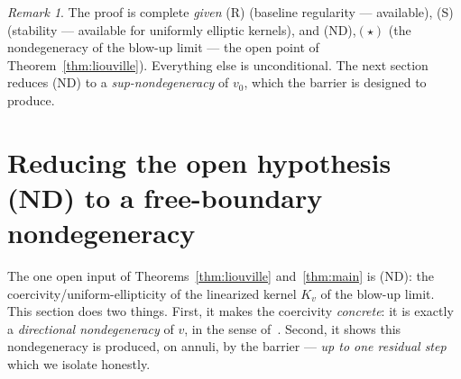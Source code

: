 \documentclass[11pt]{amsart}
\theoremstyle{plain}
\theoremstyle{definition}
\theoremstyle{remark}
\newtheorem{remark}[theorem]{Remark}
\begin{document}
\begin{remark}\label{rem:main-inputs}
The proof is complete \emph{given} \textnormal{(R)} (baseline regularity ---
available), \textnormal{(S)} (stability --- available for uniformly elliptic
kernels), and \textnormal{(ND)},$(\star)$ (the nondegeneracy of the blow-up
limit --- the open point of Theorem~\ref{thm:liouville}). Everything else is
unconditional. The next section reduces \textnormal{(ND)} to a
\emph{sup-nondegeneracy} of $v_0$, which the barrier is designed to produce.
\end{remark}

\section{Reducing the open hypothesis (ND) to a free-boundary nondegeneracy}\label{sec:reduce}
The one open input of Theorems~\ref{thm:liouville} and~\ref{thm:main} is
\textnormal{(ND)}: the coercivity/uniform-ellipticity of the linearized kernel
$K_{v}$ of the blow-up limit. This section does two things. First, it makes the
coercivity \emph{concrete}: it is exactly a \emph{directional nondegeneracy} of
$v$, in the sense of~\cite[\S6--\S7]{GJS}. Second, it shows this nondegeneracy
is produced, on annuli, by the barrier --- \emph{up to one residual step} which
we isolate honestly.
\end{document}

